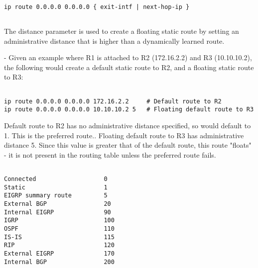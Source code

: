 \documentclass[../EngineeringJournal_CDavis.tex]{subfiles}
\begin{document}

\hspace{0.2cm}
\begin{tcolorbox}[width=6.3in]
\scriptsize
\begin{verbatim}

ip route 0.0.0.0 0.0.0.0 { exit-intf | next-hop-ip }


\end{verbatim}
\normalsize
The distance parameter is used to create a floating static route by setting an administrative distance that is higher than a dynamically learned route.
\end{tcolorbox}
\hspace{0.2cm}


\hspace{0.2cm}
\begin{tcolorbox}[width=6.3in]
  - Given an example where R1 is attached to R2 (172.16.2.2) and R3 (10.10.10.2), the following would create a default static route to R2, and a floating static route to R3:
\scriptsize
\begin{verbatim}

ip route 0.0.0.0 0.0.0.0 172.16.2.2     # Default route to R2
ip route 0.0.0.0 0.0.0.0 10.10.10.2 5   # Floating default route to R3

\end{verbatim}
\normalsize
\begin{outline}

\1 Default route to R2 has no administrative distance specified, so would default to 1. This is the preferred route..
\1 Floating default route to R3 has administrative distance 5. Since this value is greater that of the default route, this route "floats" - it is not present in the routing table unless the preferred route fails.

\end{outline}
\end{tcolorbox}
\hspace{0.2cm}


\hspace{0.2cm}
\begin{tcolorbox}[width=6.3in]
\scriptsize
\begin{verbatim}

Connected                   0
Static                      1
EIGRP summary route         5
External BGP                20
Internal EIGRP              90
IGRP                        100
OSPF                        110
IS-IS                       115
RIP                         120
External EIGRP              170
Internal BGP                200

\end{verbatim}
\normalsize
\end{tcolorbox}
\hspace{0.2cm}
\end{document}
